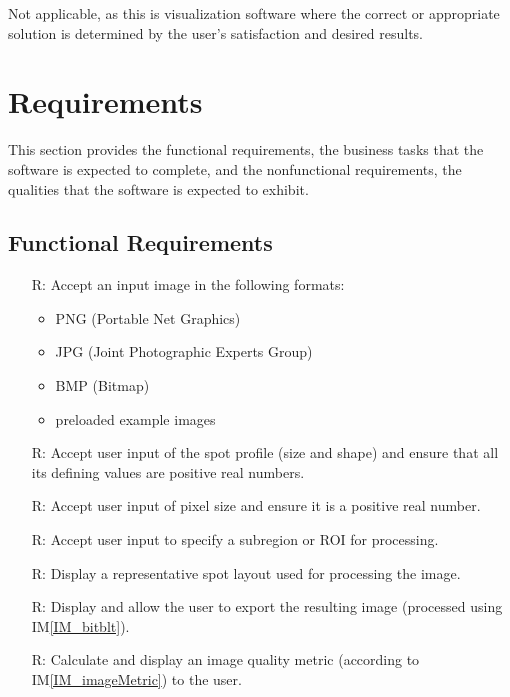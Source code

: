 \documentclass[12pt]{article}
\newcommand{\iref}[1]{IM\ref{#1}}
\newcounter{reqnum} %
\begin{document}
\noindent
Not applicable, as this is visualization software where the correct or 
appropriate solution is determined by the user's satisfaction and desired results.

\newpage
\section{Requirements}

This section provides the functional requirements, the business tasks that the
software is expected to complete, and the nonfunctional requirements, the
qualities that the software is expected to exhibit.

\subsection{Functional Requirements}

\noindent \begin{itemize}

\item[R\refstepcounter{reqnum}\thereqnum \label{R_Inputs}:] Accept an input 
image in the following formats:

  \noindent \begin{itemize}
    \item PNG (Portable Net Graphics)
    \item JPG (Joint Photographic Experts Group)
    \item BMP (Bitmap)
    \item preloaded example images
  \end{itemize}

\item[R\refstepcounter{reqnum}\thereqnum \label{R_userSpotProfile}:] Accept user 
input of the spot profile (size and shape) and ensure that all its defining 
values are positive real numbers.

\item[R\refstepcounter{reqnum}\thereqnum \label{R_userPixelSize}:] Accept user 
input of pixel size and ensure it is a positive real number.

\item[R\refstepcounter{reqnum}\thereqnum \label{R_subregion}:] Accept user
input to specify a subregion or ROI for processing.

\item[R\refstepcounter{reqnum}\thereqnum \label{R_spotLayout}:] Display a 
representative spot layout used for processing the image.

\item[R\refstepcounter{reqnum}\thereqnum \label{R_resultImage}:] Display and allow the 
user to export the resulting image (processed using \iref{IM_bitblt}).

\item[R\refstepcounter{reqnum}\thereqnum \label{R_imageMetric}:] Calculate and 
display an image quality metric (according to \iref{IM_imageMetric}) to the user.

\end{itemize}
\end{document}
